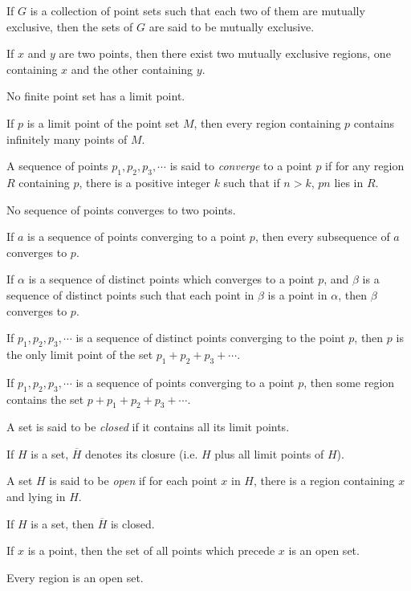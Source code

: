 \documentclass{article}
\begin{document}
\begin{description}
     If $G$ is a collection of point sets such that each two of them are mutually exclusive, then the sets of $G$ are said to be mutually exclusive.
  \item[Theorem 10:] If $x$ and $y$ are two points, then there exist two mutually exclusive regions, one containing $x$ and the other containing $y$.
  \item[Theorem 11:] No finite point set has a limit point.
  \item[Theorem 12:] If $p$ is a limit point of the point set $M$, then every region containing $p$ contains infinitely many points of $M$.
  \item[Definition:] A sequence of points $p_{1}, p_{2}, p_{3}, \cdots$ is said to \emph{converge} to a point $p$ if for any region $R$ containing $p$, there is a positive integer $k$ such that if $n>k$, $pn$ lies in $R$.
  \item[Theorem 13:] No sequence of points converges to two points.
  \item[Theorem 14:] If $a$ is a sequence of points converging to a point $p$, then every subsequence of $a$ converges to $p$.
  \item[Theorem 14.5:] If $\alpha$ is a sequence of distinct points which converges to a point $p$, and $\beta$ is a sequence of distinct points such that each point in $\beta$ is a point in $\alpha$, then $\beta$ converges to $p$.
  \item[Theorem 15:] If $p_{1}, p_{2}, p_{3}, \cdots$ is a sequence of distinct points converging to the point $p$, then $p$ is the only limit point of the set $p_{1} + p_{2} + p_{3} + \cdots$.
  \item[Theorem 16:] If $p_{1}, p_{2}, p_{3}, \cdots$ is a sequence of points converging to a point $p$, then some region contains the set $p + p_{1} + p_{2} + p_{3} + \cdots$.
  \item[Definition:] A set is said to be \emph{closed} if it contains all its limit points.
  \item[Notation:] If $H$ is a set, $\overline{H}$ denotes its closure (i.e. $H$ plus all limit points of $H$).
  \item[Definition:] A set $H$ is said to be \emph{open} if for each point $x$ in $H$, there is a region containing $x$ and lying in $H$.
  \item[Theorem 17:] If $H$ is a set, then $\overline{H}$ is closed.
  \item[Theorem 18:] If $x$ is a point, then the set of all points which precede $x$ is an open set.
  \item[Theorem 19:] Every region is an open set.

\end{description}
\end{document}
